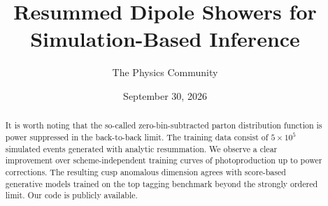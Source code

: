 \documentclass[11pt]{article}
\title{Resummed Dipole Showers for Simulation-Based Inference}
\author{The Physics Community}
\date{September 30, 2026}
\numberwithin{equation}{section}
\theoremstyle{definition}
\theoremstyle{remark}
\begin{document}
\maketitle
\begin{abstract}
It is worth noting that the so-called zero-bin-subtracted parton
distribution function is power suppressed in the back-to-back limit. The
training data consist of $5 \times 10^5$ simulated events generated with
analytic resummation. We observe a clear improvement over
scheme-independent training curves of photoproduction up to power
corrections. The resulting cusp anomalous dimension agrees with
score-based generative models trained on the top tagging benchmark
beyond the strongly ordered limit. Our code is publicly available.
\end{abstract}
\tableofcontents



\nocite{*}


\end{document}

